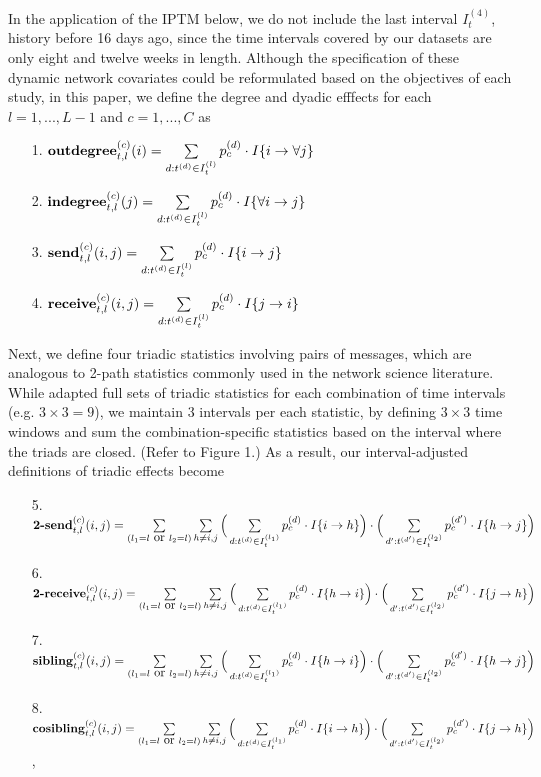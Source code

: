 \documentclass[a4paper]{article}
\begin{document}
In the application of the IPTM below, we do not include the last interval $I_t^{(4)}$, history before 16 days ago, since the time intervals covered by our datasets are only eight and twelve weeks in length. Although the specification of these dynamic network covariates could be reformulated based on the objectives of each study, in this paper, we define the degree and dyadic efffects for each $l=1,...,L-1$ and $c = 1,...,C$ as
\begin{itemize}
	\item [1.]  $\mbox{\textbf{outdegree}}^{(c)}_{t, l}(i)=\sum\limits_{d: t^{(d)} \in I_{t}^{(l)}}p_c^{(d)}\cdot I\{i\rightarrow \forall j\}$
	\item [2.] $\mbox{\textbf{indegree}}^{(c)}_{t, l}(j)=\sum\limits_{d: t^{(d)} \in I_{t}^{(l)}}p_c^{(d)}\cdot I\{\forall i \rightarrow j\}$	 	 	
	\item [3.]  $\mbox{\textbf{send}}^{(c)}_{t, l}(i, j)=\sum\limits_{d: t^{(d)} \in I_{t}^{(l)}}p_c^{(d)}\cdot I\{i\rightarrow j\}$
	\item [4.] $\mbox{\textbf{receive}}^{(c)}_{t, l}(i, j)=\sum\limits_{d: t^{(d)} \in I_{t}^{(l)}}p_c^{(d)}\cdot I\{j\rightarrow i\}$
\end{itemize}
Next, we define four triadic statistics involving pairs of messages, which are analogous to 2-path statistics commonly used in the network science literature. While \cite{PerryWolfe2012} adapted full sets of triadic statistics for each combination of time intervals (e.g. $3 \times 3=9$), we maintain 3 intervals per each statistic, by defining $3 \times 3$ time windows and sum the combination-specific statistics based on the interval where the triads are closed. (Refer to Figure 1.) As a result, our interval-adjusted definitions of triadic effects become
\begin{itemize}
	\item [5.] $\mbox{\textbf{2-send}}^{(c)}_{t, l}(i, j)=\sum\limits_{\substack{(l_1= l \mbox { or }  l_2 = l)} }\sum\limits_{h \neq i, j}\Big(\sum\limits_{d: t^{(d)} \in I_{t}^{(l_1)}}p_c^{(d)}\cdot I\{i\rightarrow h\}\Big)\cdot \Big(\sum\limits_{d': t^{(d')} \in I_{t}^{( l_2)}}p_c^{(d')}\cdot I\{h\rightarrow j\}\Big)$
	\item [6.] $\mbox{\textbf{2-receive}}^{(c)}_{t, l}(i, j)=\sum\limits_{\substack{(l_1= l \mbox { or }  l_2 = l)} }\sum\limits_{h \neq i, j}\Big(\sum\limits_{d: t^{(d)} \in I_t^{(l_1)}}p_c^{(d)}\cdot I\{h\rightarrow i\}\Big)\cdot \Big(\sum\limits_{d': t^{(d')} \in I_t^{(l_2)}}p_c^{(d')}\cdot I\{j\rightarrow h\}\Big)$
	\item [7.] $\mbox{\textbf{sibling}}^{(c)}_{t, l}(i, j)=\sum\limits_{\substack{(l_1= l \mbox { or }  l_2 = l)} }\sum\limits_{h \neq i, j}\Big(\sum\limits_{d: t^{(d)} \in I_t^{(l_1)}}p_c^{(d)}\cdot I\{h\rightarrow i\}\Big)\cdot \Big(\sum\limits_{d': t^{(d')} \in I_t^{(l_2)}}p_c^{(d')}\cdot I\{h\rightarrow j\}\Big)$
	\item [8.] $\mbox{\textbf{cosibling}}^{(c)}_{t, l}(i, j)=\sum\limits_{\substack{(l_1= l \mbox { or }  l_2 = l)} }\sum\limits_{h \neq i, j}\Big(\sum\limits_{d: t^{(d)} \in I_t^{(l_1)}}p_c^{(d)}\cdot I\{i\rightarrow h\}\Big)\cdot \Big(\sum\limits_{d': t^{(d')} \in I_t^{(l_2)}}p_c^{(d')}\cdot I\{j\rightarrow h\}\Big)$,
\end{itemize}
\end{document}
